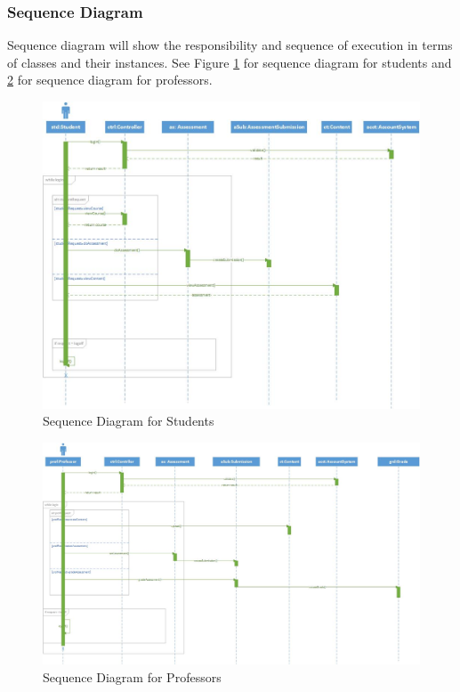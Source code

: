 \documentclass[paper=a4, fontsize=11pt]{scrartcl}
\numberwithin{equation}{section}		%
\numberwithin{figure}{section}			%
\numberwithin{table}{section}				%
\begin{document}
\subsubsection{Sequence Diagram}
Sequence diagram will show the responsibility and sequence of execution in terms of classes and their instances. See Figure \ref{stud} for sequence diagram for students and \ref{prof} for sequence diagram for professors.
\begin{figure}[!ht]
	\begin{center}
		\includegraphics[width=\textwidth,height=\textheight,keepaspectratio]{studSeq}
	\end{center}
	\caption{Sequence Diagram for Students}
	\label{stud}
\end{figure}

\begin{figure}[!ht]
	\begin{center}
		\includegraphics[width=\textwidth,height=\textheight,keepaspectratio]{profSeq}
	\end{center}
	\caption{Sequence Diagram for Professors}
	\label{prof}
\end{figure}
\end{document}
